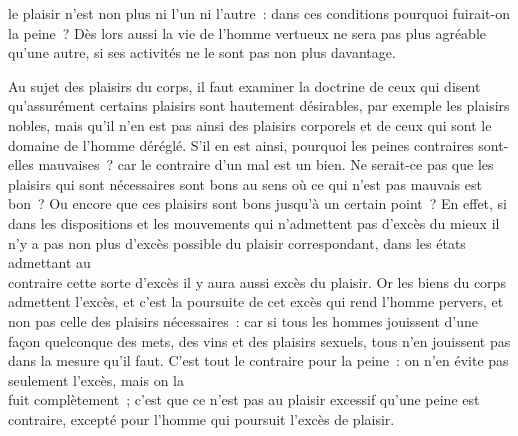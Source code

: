 \documentclass[french,twoside]{book} %
\begin{document}
le plaisir n’est non plus ni l’un ni l’autre : dans ces conditions pourquoi fuirait-on la peine ? Dès lors aussi la vie de l’homme vertueux ne sera pas plus agréable qu’une autre, si ses activités ne le sont pas non plus davantage.\par
Au sujet des plaisirs du corps, il faut examiner la doctrine de ceux qui disent qu’assurément certains plaisirs sont hautement désirables, par exemple les plaisirs nobles, mais qu’il n’en est pas ainsi des plaisirs corporels et de ceux qui sont le \\
domaine de l’homme déréglé. S’il en est ainsi, pourquoi les peines contraires sont-elles mauvaises ? car le contraire d’un mal est un bien. Ne serait-ce pas que les plaisirs qui sont nécessaires sont bons au sens où ce qui n’est pas mauvais est bon ? Ou encore que ces plaisirs sont bons jusqu’à un certain point ? En effet, si dans les dispositions et les mouvements qui n’admettent pas d’excès du mieux il n’y a pas non plus d’excès possible du plaisir correspondant, dans les états admettant au \\
contraire cette sorte d’excès il y aura aussi excès du plaisir. Or les biens du corps admettent l’excès, et c’est la poursuite de cet excès qui rend l’homme pervers, et non pas celle des plaisirs nécessaires : car si tous les hommes jouissent d’une façon quelconque des mets, des vins et des plaisirs sexuels, tous n’en jouissent pas dans la mesure qu’il faut. C’est tout le contraire pour la peine : on n’en évite pas seulement l’excès, mais on la \\
fuit complètement ; c’est que ce n’est pas au plaisir excessif qu’une peine est contraire, excepté pour l’homme qui poursuit l’excès de plaisir.
\end{document}
